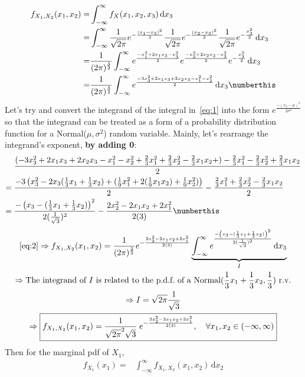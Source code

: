 \documentclass{mthe353answer}
\begin{document}
\begin{questions}
  \setcounter{question}{1}
  \question{}
  \begin{align*}
    f_{X_1,X_2}(x_1,x_2) =& \int_{-\infty}^{\infty} f_X(x_1,x_2,x_3) \,\mathrm{d}x_3\\
    =& \int_{-\infty}^{\infty} \frac{1}{\sqrt{2\pi}} e^{-\frac{(x_1-x_3)^2}{2}} \frac{1}{\sqrt{2\pi}} e^{-\frac{(x_2-x_3)^2}{2}} \frac{1}{\sqrt{2\pi}} e^{-\frac{x_3^2}{2}} \,\mathrm{d}x_3\\
    =& \frac{1}{(2\pi)^\frac{3}{2}} \int_{-\infty}^{\infty} e^{\frac{-x_1^2+2x_1x_3-x_3^2}{2}} e^{\frac{-x_2^2+2x_2x_3-x_3^2}{2}} e^{-\frac{x_3^2}{2}} \,\mathrm{d}x_3\\
    =& \frac{1}{(2\pi)^\frac{3}{2}} \int_{-\infty}^{\infty} e^{\frac{-3x_3^2+2x_1x_3+2x_2x_3-x_1^2-x_2^2}{2}} \,\mathrm{d}x_3 \numberthis \label{eq:1}
  \end{align*}
  Let's try and convert the integrand of the integral in~\eqref{eq:1} into the 
  form \(e^\frac{-(x_3-\mu)^2}{2\sigma^2}\) so that the integrand can be treated 
  as a form of a probability distribution function for a Normal(\(\mu,\sigma^2\)) 
  random variable. Mainly, let's rearrange the integrand's exponent, \textbf{by adding 0}:
  \begin{align*}
     &\; \frac{(-3x_3^2+2x_1x_3+2x_2x_3-x_1^2-x_2^2+\frac{2}{3}x_1^2+\frac{2}{3}x_2^2-\frac{2}{3}x_1x_2+)-\frac{2}{3}x_1^2-\frac{2}{3}x_2^2+\frac{2}{3}x_1x_2}{2}\\
    =&\; \frac{-3\left(x_3^2 - 2x_3(\frac{1}{3}x_1+\frac{1}{3}x_2) + (\frac{1}{9}x_1^2 + 2(\frac{1}{9}x_1x_2) + \frac{1}{9}x_2^2)\right)}{2} - \frac{\frac{2}{3}x_1^2 + \frac{2}{3}x_2^2 - \frac{2}{3}x_1x_2}{2}\\
    =&\; \frac{-\left(x_3-(\frac{1}{3}x_1+\frac{1}{3}x_2)\right)^2}{2(\frac{1}{\sqrt{3}})^2} - \frac{2x_2^2-2x_1x_2+2x_1^2}{2(3)} \numberthis \label{eq:2}
  \end{align*}
  \begin{gather*}
    \text{\eqref{eq:2}} \Rightarrow f_{X_1,X_2}(x_1,x_2) = \frac{1}{(2\pi)^\frac{3}{2}} e^{-\frac{2x_2^2-2x_1x_2+2x_1^2}{2(3)}} 
      \underbrace{\int_{-\infty}^{\infty} e^{\frac{-\left(x_3-(\frac{1}{3}x_1+\frac{1}{3}x_2)\right)^2}{2(\frac{1}{\sqrt{3}})^2}} \,\mathrm{d}x_3}_{I}\\
    \Rightarrow \text{The integrand of \(I\) is related to the p.d.f.\ of a Normal(\(\frac{1}{3}x_1+\frac{1}{3}x_2, \frac{1}{3}\)) r.v.}\\
    \Rightarrow I = \sqrt{2\pi}\frac{1}{\sqrt{3}}\\
    \Rightarrow 
    \boxed{f_{X_1,X_2}(x_1,x_2) = \frac{1}{\sqrt{2\pi}^2\sqrt{3}}\;e^{-\frac{2x_2^2-2x_1x_2+2x_1^2}{2(3)}},\quad \forall x_1,x_2 \in (-\infty,\infty)}
  \end{gather*}
  Then for the marginal pdf of \(X_1\),
  \begin{align*}
    f_{X_1}(x_1) =& \int_{-\infty}^{\infty} f_{X_1,X_2}(x_1,x_2) \,\mathrm{d}x_2\\
  \end{align*}
\end{questions}
\end{document}

